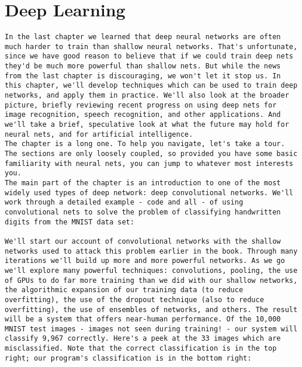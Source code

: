 
\chapter{Deep Learning}
\label{sec:DeepLearning}

\begin{lstlisting}
In the last chapter we learned that deep neural networks are often much harder to train than shallow neural networks. That's unfortunate, since we have good reason to believe that if we could train deep nets they'd be much more powerful than shallow nets. But while the news from the last chapter is discouraging, we won't let it stop us. In this chapter, we'll develop techniques which can be used to train deep networks, and apply them in practice. We'll also look at the broader picture, briefly reviewing recent progress on using deep nets for image recognition, speech recognition, and other applications. And we'll take a brief, speculative look at what the future may hold for neural nets, and for artificial intelligence.
The chapter is a long one. To help you navigate, let's take a tour. The sections are only loosely coupled, so provided you have some basic familiarity with neural nets, you can jump to whatever most interests you.
The main part of the chapter is an introduction to one of the most widely used types of deep network: deep convolutional networks. We'll work through a detailed example - code and all - of using convolutional nets to solve the problem of classifying handwritten digits from the MNIST data set:

We'll start our account of convolutional networks with the shallow networks used to attack this problem earlier in the book. Through many iterations we'll build up more and more powerful networks. As we go we'll explore many powerful techniques: convolutions, pooling, the use of GPUs to do far more training than we did with our shallow networks, the algorithmic expansion of our training data (to reduce overfitting), the use of the dropout technique (also to reduce overfitting), the use of ensembles of networks, and others. The result will be a system that offers near-human performance. Of the 10,000 MNIST test images - images not seen during training! - our system will classify 9,967 correctly. Here's a peek at the 33 images which are misclassified. Note that the correct classification is in the top right; our program's classification is in the bottom right:


\end{lstlisting}
